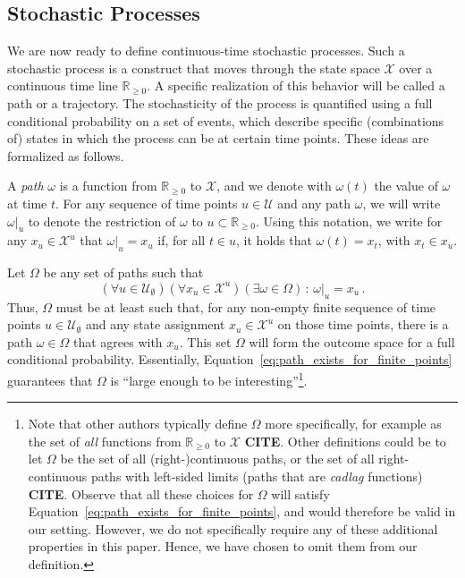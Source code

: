 \documentclass[10pt,a4paper]{paper}
\theoremstyle{definition}
\newcommand{\reals}{\mathbb{R}}
\newcommand{\realsnonneg}{\reals_{\geq 0}}
\newcommand{\states}{\mathcal{X}}
\newcommand{\paths}{\Omega}
\begin{document}
\subsection{Stochastic Processes}\label{sec:def_stochastic_processes}

We are now ready to define continuous-time stochastic processes. Such a stochastic process is a construct that moves through the state space $\states$ over a continuous time line $\realsnonneg$. A specific realization of this behavior will be called a path or a trajectory. The stochasticity of the process is quantified using a full conditional probability on a set of events, which describe specific (combinations of) states in which the process can be at certain time points. These ideas are formalized as follows.


A \emph{path} $\omega$ is a function from $\realsnonneg$ to $\states$, and we denote with $\omega(t)$ the value of $\omega$ at time $t$. For any sequence of time points $u\in\mathcal{U}$ and any path $\omega$, we will write $\omega\vert_{u}$ to denote the restriction of $\omega$ to $u\subset\realsnonneg$. Using this notation, we write for any $x_u\in\states^u$ that $\omega\vert_u=x_u$ if, for all $t\in u$, it holds that $\omega(t)=x_{t}$, with $x_t\in x_u$.

Let $\paths$ be any set of paths such that
\begin{equation}\label{eq:path_exists_for_finite_points}
(\forall u\in\mathcal{U}_\emptyset)(\forall x_u\in\states^u)(\exists \omega\in\Omega)\,:\,\omega\vert_u=x_u\,.
\end{equation}
Thus, $\Omega$ must be at least such that, for any non-empty finite sequence of time points $u\in\mathcal{U}_\emptyset$ and any state assignment $x_u\in\states^u$ on those time points, there is a path $\omega\in\Omega$ that agrees with $x_u$. This set $\Omega$ will form the outcome space for a full conditional probability. Essentially, Equation~\eqref{eq:path_exists_for_finite_points} guarantees that $\Omega$ is ``large enough to be interesting''\footnote{ Note that other authors typically define $\Omega$ more specifically, for example as the set of \emph{all} functions from $\realsnonneg$ to $\states$ {\bf CITE}. Other definitions could be to let $\Omega$ be the set of all (right-)continuous paths, or the set of all right-continuous paths with left-sided limits (paths that are \emph{cadlag} functions) {\bf CITE}. Observe that all these choices for $\Omega$ will satisfy Equation~\eqref{eq:path_exists_for_finite_points}, and would therefore be valid in our setting. However, we do not specifically require any of these additional properties in this paper. Hence, we have chosen to omit them from our definition.}.
\end{document}
